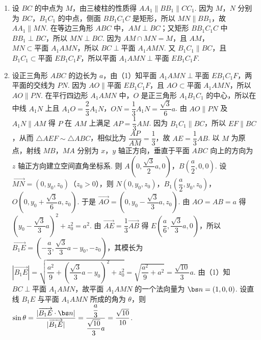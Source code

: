 \begin{solution}
\begin{enumerate}
\item 设 \(BC\) 的中点为 \(M\)，由三棱柱的性质得 \(AA_1\parallel BB_1\parallel CC_1\). 因为 \(M\)，\(N\) 分别为 \(BC\)，\(B_1C_1\) 的中点，侧面 \(BB_1C_1C\) 是矩形，所以 \(MN\parallel BB_1\)，故 \(AA_1\parallel MN\). 在等边三角形 \(ABC\) 中，\(AM\perp BC\)；又矩形 \(BB_1C_1C\) 中 \(BB_1\perp BC\)，所以 \(MN\perp BC\). 因为 \(AM\cap MN=M\)，且 \(AM\)，\(MN\subset\text{平面 }A_1AMN\)，所以 \(BC\perp\text{平面 }A_1AMN\). 又 \(B_1C_1\parallel BC\)，且 \(B_1C_1\subset\text{平面 }EB_1C_1F\)，所以平面 \(A_1AMN\perp\text{平面 }EB_1C_1F\).
\item 设正三角形 \(ABC\) 的边长为 \(a\)，由（1）知平面 \(A_1AMN\perp\text{平面 }EB_1C_1F\)，两平面的交线为 \(PN\). 因为 \(AO\parallel\text{平面 }EB_1C_1F\)，且 \(AO\subset\text{平面 }A_1AMN\)，所以 \(AO\parallel PN\). 在平行四边形 \(A_1AMN\) 中，\(O\) 是正三角形 \(A_1B_1C_1\) 的中心，所以在中线 \(A_1N\) 上且 \(A_1O=\dfrac23 A_1N\)，\(ON=\dfrac13 A_1N=\dfrac{\sqrt3}{6}a\). 由 \(AO\parallel PN\) 及 \(A_1N\parallel AM\) 得 \(P\) 在 \(AM\) 上满足 \(AP=\dfrac13 AM\). 因为 \(B_1C_1\parallel BC\)，所以 \(EF\parallel BC\)，从而 \(\triangle AEF\sim\triangle ABC\)，相似比为 \(\dfrac{AP}{AM}=\dfrac13\)，故 \(AE=\dfrac13 AB\). 以 \(M\) 为原点，射线 \(MB\)，\(MA\) 分别为 \(x\)，\(y\) 轴正方向，垂直于平面 \(ABC\) 向上的方向为 \(z\) 轴正方向建立空间直角坐标系. 则 \(A\left(0,\dfrac{\sqrt3}{2}a,0\right)\)，\(B\left(\dfrac a2,0,0\right)\). 设 \(\overrightarrow{MN}=(0,y_0,z_0)\)（\(z_0>0\)），则 \(N(0,y_0,z_0)\)，\(B_1\left(\dfrac a2,y_0,z_0\right)\)，\(O\left(0,y_0+\dfrac{\sqrt3}{6}a,z_0\right)\). 于是 \(\overrightarrow{AO}=\left(0,y_0-\dfrac{\sqrt3}{3}a,z_0\right)\). 由 \(AO=AB=a\) 得 \(\left(y_0-\dfrac{\sqrt3}{3}a\right)^2+z_0^2=a^2\). 由 \(\overrightarrow{AE}=\dfrac13\overrightarrow{AB}\) 得 \(E\left(\dfrac a6,\dfrac{\sqrt3}{3}a,0\right)\)，所以 \(\overrightarrow{B_1E}=\left(-\dfrac a3,\dfrac{\sqrt3}{3}a-y_0,-z_0\right)\)，其模长为 \(|\overrightarrow{B_1E}|=\sqrt{\dfrac{a^2}{9}+\left(\dfrac{\sqrt3}{3}a-y_0\right)^2+z_0^2}=\sqrt{\dfrac{a^2}{9}+a^2}=\dfrac{\sqrt{10}}{3}a\). 由（1）知 \(BC\perp\text{平面 }A_1AMN\)，故平面 \(A_1AMN\) 的一个法向量为 \(\bs n=(1,0,0)\). 设直线 \(B_1E\) 与平面 \(A_1AMN\) 所成的角为 \(\theta\)，则 \(\sin\theta=\dfrac{|\overrightarrow{B_1E}\cdot\bs n|}{|\overrightarrow{B_1E}|}=\dfrac{\dfrac a3}{\dfrac{\sqrt{10}}{3}a}=\dfrac{\sqrt{10}}{10}\).
\end{enumerate}
\end{solution}

